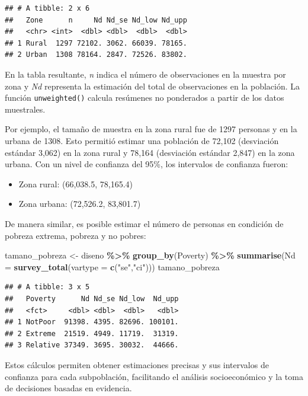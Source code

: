 \documentclass[
  spanish,
  12pt,
]{book}
\newenvironment{Shaded}{\begin{snugshade}}{\end{snugshade}}
\newcommand{\AttributeTok}[1]{\textcolor[rgb]{0.13,0.29,0.53}{#1}}
\newcommand{\FunctionTok}[1]{\textcolor[rgb]{0.13,0.29,0.53}{\textbf{#1}}}
\newcommand{\NormalTok}[1]{#1}
\newcommand{\OtherTok}[1]{\textcolor[rgb]{0.56,0.35,0.01}{#1}}
\newcommand{\SpecialCharTok}[1]{\textcolor[rgb]{0.81,0.36,0.00}{\textbf{#1}}}
\newcommand{\StringTok}[1]{\textcolor[rgb]{0.31,0.60,0.02}{#1}}
\providecommand{\tightlist}{%
  \setlength{\itemsep}{0pt}\setlength{\parskip}{0pt}}
\begin{document}
\begin{verbatim}
## # A tibble: 2 x 6
##   Zone      n     Nd Nd_se Nd_low Nd_upp
##   <chr> <int>  <dbl> <dbl>  <dbl>  <dbl>
## 1 Rural  1297 72102. 3062. 66039. 78165.
## 2 Urban  1308 78164. 2847. 72526. 83802.
\end{verbatim}

En la tabla resultante, \emph{n} indica el número de observaciones en la muestra por zona y \emph{Nd} representa la estimación del total de observaciones en la población. La función \texttt{unweighted()} calcula resúmenes no ponderados a partir de los datos muestrales.

Por ejemplo, el tamaño de muestra en la zona rural fue de 1297 personas y en la urbana de 1308. Esto permitió estimar una población de 72,102 (desviación estándar 3,062) en la zona rural y 78,164 (desviación estándar 2,847) en la zona urbana. Con un nivel de confianza del 95\%, los intervalos de confianza fueron:

\begin{itemize}
\tightlist
\item
  Zona rural: (66,038.5, 78,165.4)
\item
  Zona urbana: (72,526.2, 83,801.7)
\end{itemize}

De manera similar, es posible estimar el número de personas en condición de pobreza extrema, pobreza y no pobres:

\begin{Shaded}
\begin{Highlighting}[]
\NormalTok{tamano\_pobreza }\OtherTok{\textless{}{-}}\NormalTok{ diseno }\SpecialCharTok{\%\textgreater{}\%} \FunctionTok{group\_by}\NormalTok{(Poverty) }\SpecialCharTok{\%\textgreater{}\%} 
                  \FunctionTok{summarise}\NormalTok{(}\AttributeTok{Nd =} \FunctionTok{survey\_total}\NormalTok{(}\AttributeTok{vartype =} \FunctionTok{c}\NormalTok{(}\StringTok{"se"}\NormalTok{,}\StringTok{"ci"}\NormalTok{)))}
\NormalTok{tamano\_pobreza}
\end{Highlighting}
\end{Shaded}

\begin{verbatim}
## # A tibble: 3 x 5
##   Poverty      Nd Nd_se Nd_low  Nd_upp
##   <fct>     <dbl> <dbl>  <dbl>   <dbl>
## 1 NotPoor  91398. 4395. 82696. 100101.
## 2 Extreme  21519. 4949. 11719.  31319.
## 3 Relative 37349. 3695. 30032.  44666.
\end{verbatim}

Estos cálculos permiten obtener estimaciones precisas y sus intervalos de confianza para cada subpoblación, facilitando el análisis socioeconómico y la toma de decisiones basadas en evidencia.
\end{document}
